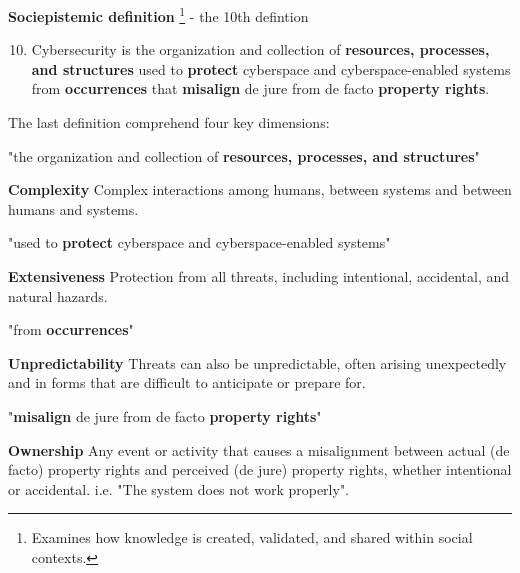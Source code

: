 \textbf{Sociepistemic definition} \footnote{Examines how knowledge is created, validated, and shared within social contexts.} - the 10th defintion
\begin{enumerate}
    \setcounter{enumi}{9}
    \item Cybersecurity is the organization and collection of \textbf{resources, processes, and structures} used to \textbf{protect} cyberspace and cyberspace-enabled systems from \textbf{occurrences} that \textbf{misalign} de jure from de facto \textbf{property rights}.
\end{enumerate}
\clearpage
The last definition comprehend four key dimensions:
\begin{multicols}{2}
    \centering "the organization and collection of \textbf{resources, processes, and structures}"

    \columnbreak

    \textbf{Complexity}
        \newline Complex interactions among humans, between systems and between humans and systems.

\end{multicols}
    

\begin{multicols}{2}
    \centering "used to \textbf{protect} cyberspace and cyberspace-enabled systems"

    \columnbreak

    \textbf{Extensiveness}
        \newline Protection from all threats, including intentional, accidental, and natural hazards.

\end{multicols}

\begin{multicols}{2}
    \centering "from \textbf{occurrences}"

    \columnbreak

    \textbf{Unpredictability}
        \newline Threats can also be unpredictable, often arising unexpectedly and in forms that are difficult to anticipate or prepare for.

\end{multicols}


\begin{multicols}{2}
    \centering "\textbf{misalign} de jure from de facto \textbf{property rights}"

    \columnbreak

    \textbf{Ownership}
        \newline Any event or activity that causes a misalignment between actual (de facto) property rights and perceived (de jure) property rights, whether intentional or accidental. i.e. "The system does not work properly".

\end{multicols}


